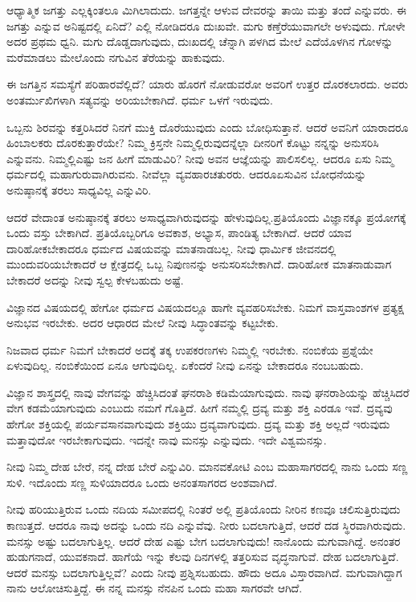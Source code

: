 ಆಧ್ಯಾತ್ಮಿಕ ಜಗತ್ತು ಎಲ್ಲಕ್ಕಿಂತಲೂ ಮಿಗಿಲಾದುದು. ಜಗತ್ತನ್ನೇ ಆಳುವ ದೇವರನ್ನು ತಾಯಿ ಮತ್ತು ತಂದೆ ಎನ್ನುವರು. ಈ ಜಗತ್ತು ಎನ್ನುವ ಅನಿಷ್ಟದಲ್ಲಿ ಏನಿದೆ? ಎಲ್ಲಿ ನೋಡಿದರೂ ದುಃಖವೇ. ಮಗು ಕಣ್ತೆರೆಯುವಾಗಲೇ ಅಳುವುದು. ಗೋಳೇ ಅದರ ಪ್ರಥಮ ಧ್ವನಿ. ಮಗು ದೊಡ್ಡದಾಗುವುದು, ದುಃಖದಲ್ಲಿ ಚೆನ್ನಾಗಿ ಪಳಗಿದ ಮೇಲೆ ಎದೆಯೊಳಗಿನ ಗೋಳನ್ನು ಮರೆಮಾಡಲು ಮೇಲೊಂದು ನಗುವಿನ ತೆರೆಯನ್ನು ಹಾಕುವುದು.

ಈ ಜಗತ್ತಿನ ಸಮಸ್ಯೆಗೆ ಪರಿಹಾರವೆಲ್ಲಿದೆ? ಯಾರು ಹೊರಗೆ ನೋಡುವರೋ ಅವರಿಗೆ ಉತ್ತರ ದೊರಕಲಾರದು. ಅವರು ಅಂತರ್ಮುಖಿಗಳಾಗಿ ಸತ್ಯವನ್ನು ಅರಿಯಬೇಕಾಗಿದೆ. ಧರ್ಮ ಒಳಗೆ ಇರುವುದು.

ಒಬ್ಬನು ಶಿರವನ್ನು ಕತ್ತರಿಸಿದರೆ ನಿನಗೆ ಮುಕ್ತಿ ದೊರೆಯುವುದು ಎಂದು ಬೋಧಿಸುತ್ತಾನೆ. ಆದರೆ ಅವನಿಗೆ ಯಾರಾದರೂ ಹಿಂಬಾಲಕರು ದೊರಕುತ್ತಾರೆಯೇ? ನಿಮ್ಮ ಕ್ರಿಸ್ತನೇ ನಿಮ್ಮಲ್ಲಿರುವುದನ್ನೆಲ್ಲಾ ದೀನರಿಗೆ ಕೊಟ್ಟು ನನ್ನನ್ನು ಅನುಸರಿಸಿ ಎನ್ನುವನು. ನಿಮ್ಮಲ್ಲಿ\break ಎಷ್ಟು ಜನ ಹೀಗೆ ಮಾಡುವಿರಿ? ನೀವು ಅವನ ಆಜ್ಞೆಯನ್ನು ಪಾಲಿಸಲಿಲ್ಲ. ಆದರೂ ಏಸು ನಿಮ್ಮ ಧರ್ಮದಲ್ಲಿ ಮಹಾಗುರುವಾಗಿರುವನು. ನೀವೆಲ್ಲಾ ವ್ಯವಹಾರಚತುರರು. ಆದರೂ\break ಏಸುವಿನ ಬೋಧನೆಯನ್ನು ಅನುಷ್ಠಾನಕ್ಕೆ ತರಲು ಸಾಧ್ಯವಿಲ್ಲ ಎನ್ನುವಿರಿ.

ಆದರೆ ವೇದಾಂತ ಅನುಷ್ಠಾನಕ್ಕೆ ತರಲು ಅಸಾಧ್ಯವಾಗಿರುವುದನ್ನು ಹೇಳುವುದಿಲ್ಲ.\break ಪ್ರತಿಯೊಂದು ವಿಜ್ಞಾನಕ್ಕೂ ಪ್ರಯೋಗಕ್ಕೆ ಒಂದು ವಸ್ತು ಬೇಕಾಗಿದೆ. ಪ್ರತಿಯೊಬ್ಬರಿಗೂ ಅವಕಾಶ, ಅಭ್ಯಾಸ, ಪಾಂಡಿತ್ಯ ಬೇಕಾಗಿದೆ. ಆದರೆ ಯಾವ ದಾರಿಹೋಕಬೇಕಾದರೂ ಧರ್ಮದ ವಿಷಯವನ್ನು ಮಾತನಾಡಬಲ್ಲ. ನೀವು ಧಾರ್ಮಿಕ ಜೀವನದಲ್ಲಿ ಮುಂದುವರಿಯಬೇಕಾದರೆ ಆ ಕ್ಷೇತ್ರದಲ್ಲಿ ಒಬ್ಬ ನಿಪುಣನನ್ನು ಅನುಸರಿಸಬೇಕಾಗಿದೆ. ದಾರಿಹೋಕ ಮಾತನಾಡುವಾಗ ಬೇಕಾದರೆ ಅದನ್ನು ನೀವು ಸ್ವಲ್ಪ ಕೇಳಬಹುದು ಅಷ್ಟೆ.

ವಿಜ್ಞಾನದ ವಿಷಯದಲ್ಲಿ ಹೇಗೋ ಧರ್ಮದ ವಿಷಯದಲ್ಲೂ ಹಾಗೇ ವ್ಯವಹರಿಸಬೇಕು. ನಿಮಗೆ ವಾಸ್ತವಾಂಶಗಳ ಪ್ರತ್ಯಕ್ಷ ಅನುಭವ ಇರಬೇಕು. ಅದರ ಆಧಾರದ ಮೇಲೆ ನೀವು ಸಿದ್ಧಾಂತವನ್ನು ಕಟ್ಟಬೇಕು.

ನಿಜವಾದ ಧರ್ಮ ನಿಮಗೆ ಬೇಕಾದರೆ ಅದಕ್ಕೆ ತಕ್ಕ ಉಪಕರಣಗಳು ನಿಮ್ಮಲ್ಲಿ ಇರಬೇಕು. ನಂಬಿಕೆಯ ಪ್ರಶ್ನೆಯೇ ಏಳುವುದಿಲ್ಲ. ನಂಬಿಕೆಯಿಂದ ಏನೂ ಆಗುವುದಿಲ್ಲ. ಏಕೆಂದರೆ ನೀವು ಏನನ್ನು ಬೇಕಾದರೂ ನಂಬಬಹುದು.

ವಿಜ್ಞಾನ ಶಾಸ್ತ್ರದಲ್ಲಿ ನಾವು ವೇಗವನ್ನು ಹೆಚ್ಚಿಸಿದಂತೆ ಘನರಾಶಿ  ಕಡಿಮೆಯಾಗುವುದು. ನಾವು ಘನರಾಶಿಯನ್ನು  ಹೆಚ್ಚಿಸಿದರೆ ವೇಗ ಕಡಮೆಯಾಗುವುದು ಎಂಬುದು ನಮಗೆ ಗೊತ್ತಿದೆ. ಹೀಗೆ ನಮ್ಮಲ್ಲಿ ದ್ರವ್ಯ ಮತ್ತು ಶಕ್ತಿ ಎರಡೂ ಇವೆ. ದ್ರವ್ಯವು ಹೇಗೋ ಶಕ್ತಿಯಲ್ಲಿ ಪರ್ಯವಸಾನವಾಗುವುದು ಶಕ್ತಿಯು ದ್ರವ್ಯವಾಗುವುದು. ದ್ರವ್ಯ ಮತ್ತು ಶಕ್ತಿ ಅಲ್ಲದೆ ಇರುವುದು ಮತ್ತಾವುದೋ ಇರಬೇಕಾಗುವುದು. ಇದನ್ನೇ ನಾವು ಮನಸ್ಸು ಎನ್ನುವುದು. ಇದೇ ವಿಶ್ವಮನಸ್ಸು.

ನೀವು ನಿಮ್ಮ ದೇಹ ಬೇರೆ, ನನ್ನ ದೇಹ ಬೇರೆ ಎನ್ನುವಿರಿ. ಮಾನವಕೋಟಿ ಎಂಬ ಮಹಾಸಾಗರದಲ್ಲಿ ನಾನು ಒಂದು ಸಣ್ಣ ಸುಳಿ. ಇದೊಂದು ಸಣ್ಣ ಸುಳಿಯಾದರೂ ಒಂದು ಅನಂತಸಾಗರದ ಅಂಶವಾಗಿದೆ.

ನೀವು ಹರಿಯುತ್ತಿರುವ ಒಂದು ನದಿಯ ಸಮೀಪದಲ್ಲಿ ನಿಂತರೆ ಅಲ್ಲಿ ಪ್ರತಿಯೊಂದು ನೀರಿನ ಕಣವೂ ಚಲಿಸುತ್ತಿರುವುದು ಕಾಣುತ್ತದೆ. ಆದರೂ ನಾವು ಅದನ್ನು ಒಂದು ನದಿ ಎನ್ನುವೆವು. ನೀರು ಬದಲಾಗುತ್ತಿದೆ, ಆದರೆ ದಡ ಸ್ಥಿರವಾಗಿರುವುದು. ಮನಸ್ಸು ಅಷ್ಟು ಬದಲಾಗುತ್ತಿಲ್ಲ. ಆದರೆ ದೇಹ ಎಷ್ಟು ಬೇಗ ಬದಲಾಗುವುದು! ನಾನೊಂದು ಮಗುವಾಗಿದ್ದೆ. ಅನಂತರ ಹುಡುಗನಾದೆ, ಯುವಕನಾದೆ. ಹಾಗೆಯೆ ಇನ್ನು ಕೆಲವು ದಿನಗಳಲ್ಲಿ ತತ್ತರಿಸುವ ವೃದ್ಧನಾಗುವೆ. ದೇಹ ಬದಲಾಗುತ್ತಿದೆ. ಆದರೆ ಮನಸ್ಸು ಬದಲಾಗುತ್ತಿಲ್ಲವೆ? ಎಂದು ನೀವು ಪ್ರಶ್ನಿಸಬಹುದು. ಹೌದು ಅದೂ ವಿಸ್ತಾರವಾಗಿದೆ. ಮಗುವಾಗಿದ್ದಾಗ ನಾನು ಆಲೋಚಿಸುತ್ತಿದ್ದೆ. ಈ ನನ್ನ ಮನಸ್ಸು ನೆನಪಿನ ಒಂದು ಮಹಾ ಸಾಗರವೇ ಆಗಿದೆ.

